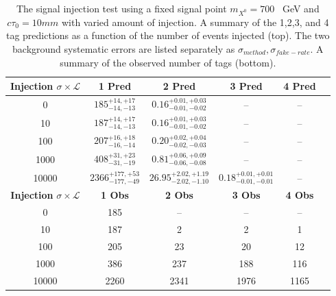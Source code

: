 \begin{table}
\caption{The signal injection test using a fixed signal point $m_{{X^0}} = 700$ ~GeV and $c\tau_0 = 10mm$ with varied amount of injection.
 A summary of the 1,2,3, and 4 tag predictions as a function of the number of events injected (top).  The two background systematic errors are
listed separately as $\sigma_{method},\sigma_{fake-rate}$. A summary of the observed number of tags (bottom). 
  \label{tab:700_injection_summary}}
\begin{center}
\begin{tabular}{cccccc}
\hline 
\textbf{Injection} $\sigma\times\mathcal{L}$  & \textbf{1 Pred} & \textbf{2 Pred} & \textbf{3 Pred} &\textbf{4 Pred} \\
\hline
0 &$ 185^{+14,+17}_{-14,-13} $&$0.16^{+0.01,+0.03}_{-0.01,-0.02}$& -- &-- \\
10 &$ 187^{+14,+17}_{-14,-13} $&$0.16^{+0.01,+0.03}_{-0.01,-0.02}$& -- &-- \\
100 &$ 207^{+16,+18}_{-16,-14} $&$0.20^{+0.02,+0.04}_{-0.02,-0.03} $&--&-- \\
1000 &$ 408^{+31,+23}_{-31,-19} $&$0.81^{+0.06,+0.09}_{-0.06,-0.08} $&--&-- \\
10000 &$ 2366^{+177,+53}_{-177,-49} $&$26.95^{+2.02,+1.19}_{-2.02,-1.10} $&$0.18^{+0.01,+0.01}_{-0.01,-0.01} $&-- \\
\hline 
\hline
\textbf{Injection} $\sigma\times\mathcal{L}$ & \textbf{1 Obs} & \textbf{2 Obs} & \textbf{3 Obs} & \textbf{4 Obs}\\
\hline
0 & 185 & -- & -- & -- \\
10 & 187 & 2 & 2 & 1 \\ 
100 & 205 & 23 & 20 & 12 \\
1000 & 386 & 237 & 188 & 116 \\
10000 & 2260 & 2341 & 1976 & 1165 \\
\hline 
\end{tabular} 
\end{center}
\end{table}

